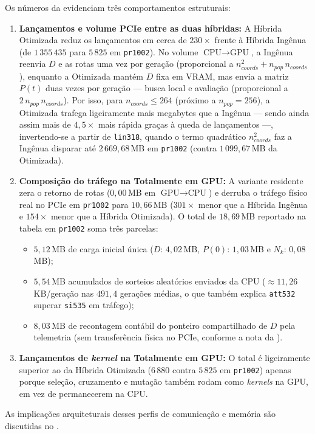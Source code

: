 Os números da  evidenciam três comportamentos estruturais:

\begin{enumerate}
  \item
        \textbf{Lançamentos e volume PCIe entre as duas híbridas:} A Híbrida Otimizada reduz os lançamentos em cerca de \(230\times\) frente à Híbrida Ingênua (de \(1\,355\,435\) para \(5\,825\) em \texttt{pr1002}). No volume \(\text{CPU} \to \text{GPU}\), a Ingênua reenvia \(D\) e as rotas uma vez por geração (proporcional a \(n_{coords}^2 + n_{pop}\,n_{coords}\)), enquanto a Otimizada mantém \(D\) fixa em VRAM, mas envia a matriz \(P(t)\) duas vezes por geração --- busca local e avaliação (proporcional a \(2\,n_{pop}\,n_{coords}\)).
        Por isso, para \(n_{coords} \le 264\) (próximo a \(n_{pop} = 256\)), a Otimizada trafega ligeiramente mais megabytes que a Ingênua --- sendo ainda assim mais de \(4{,}5\times\) mais rápida graças à queda de lançamentos ---, invertendo-se a partir de \texttt{lin318}, quando o termo quadrático \(n_{coords}^2\) faz a Ingênua disparar até \(2\,669{,}68\)\,MB em \texttt{pr1002} (contra \(1\,099{,}67\)\,MB da Otimizada).
  \item
        \textbf{Composição do tráfego na Totalmente em GPU:} A variante residente zera o retorno de rotas (\(0{,}00\)\,MB em \(\text{GPU} \to \text{CPU}\)) e derruba o tráfego físico real no PCIe em \texttt{pr1002} para \(10{,}66\)\,MB (\(301\times\) menor que a Híbrida Ingênua e \(154\times\) menor que a Híbrida Otimizada). O total de \(18{,}69\)\,MB reportado na tabela em \texttt{pr1002} soma três parcelas:
        \begin{itemize}
          \item \(5{,}12\)\,MB de carga inicial única (\(D\): \(4{,}02\)\,MB, \(P(0)\): \(1{,}03\)\,MB e \(N_k\): \(0{,}08\)\,MB);
          \item \(5{,}54\)\,MB acumulados de sorteios aleatórios enviados da CPU (\(\approx 11{,}26\)\,KB/geração nas \(491{,}4\) gerações médias, o que também explica \texttt{att532} superar \texttt{si535} em tráfego);
          \item \(8{,}03\)\,MB de recontagem contábil do ponteiro compartilhado de \(D\) pela telemetria (sem transferência física no PCIe, conforme a nota da ).
        \end{itemize}
  \item
        \textbf{Lançamentos de \emph{kernel} na Totalmente em GPU:} O total é ligeiramente superior ao da Híbrida Otimizada (\(6\,880\) contra \(5\,825\) em \texttt{pr1002}) apenas porque seleção, cruzamento e mutação também rodam como \emph{kernels} na GPU, em vez de permanecerem na CPU.
\end{enumerate}

As implicações arquiteturais desses perfis de comunicação e memória são discutidas no .
